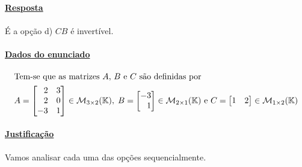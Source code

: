 \exercicio{}

\paragraph{\underline{Resposta}}

\paragraph{}É a opção d) $CB$ é invertível.

\paragraph{\underline{Dados do enunciado}}

\begin{align*}
	\intertext{Tem-se que as matrizes $A$, $B$ e $C$ são definidas por}
	A =
	\begin{bmatrix*}[r]
		2  & 3\\
		2  & 0\\
		-3 & 1
	\end{bmatrix*}
	\in
	\mathcal{M}_{3 \times 2}(\mathbb{K})
	,\;
	B =
	\begin{bmatrix*}[r]
		-3\\
		1
	\end{bmatrix*}
	\in
	\mathcal{M}_{2 \times 1}(\mathbb{K})
	 \text{ e }
	C =
	\begin{bmatrix*}[r]
		1  & 2
	\end{bmatrix*}
	\in
	\mathcal{M}_{1 \times 2}(\mathbb{K})
\end{align*}

\paragraph{\underline{Justificação}}

\paragraph{}Vamos analisar cada uma das opções sequencialmente.


